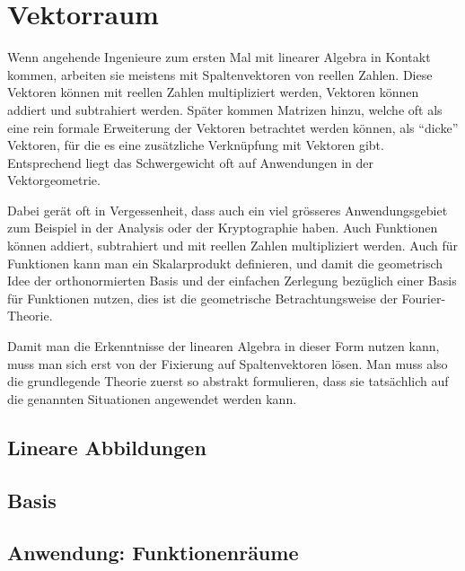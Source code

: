 %
%
%
\chapter{Vektorraum}
Wenn angehende Ingenieure zum ersten Mal mit linearer Algebra in
Kontakt kommen, arbeiten sie meistens mit Spaltenvektoren von
reellen Zahlen.
Diese Vektoren können mit reellen Zahlen multipliziert werden,
Vektoren können addiert und subtrahiert werden.
Später kommen Matrizen hinzu, welche oft als eine rein formale
Erweiterung der Vektoren betrachtet werden können, als ``dicke''
Vektoren, für die es eine zusätzliche Verknüpfung mit Vektoren
gibt.
Entsprechend liegt das Schwergewicht oft auf Anwendungen in der
Vektorgeometrie.

Dabei gerät oft in Vergessenheit, dass auch ein viel grösseres
Anwendungsgebiet zum Beispiel in der Analysis oder der Kryptographie
haben.
Auch Funktionen können addiert, subtrahiert und mit reellen Zahlen
multipliziert werden.
Auch für Funktionen kann man ein Skalarprodukt definieren, und
damit die geometrisch Idee der orthonormierten Basis und der
einfachen Zerlegung bezüglich einer Basis für Funktionen nutzen,
dies ist die geometrische Betrachtungsweise der Fourier-Theorie.

Damit man die Erkenntnisse der linearen Algebra in dieser Form
nutzen kann, muss man sich erst von der Fixierung auf Spaltenvektoren
lösen.
Man muss also die grundlegende Theorie zuerst so abstrakt formulieren,
dass sie tatsächlich auf die genannten Situationen angewendet werden 
kann.





\section{Lineare Abbildungen}

\section{Basis}

\section{Anwendung: Funktionenräume}



